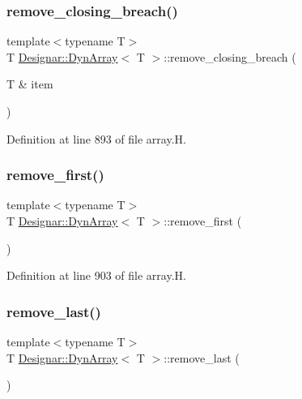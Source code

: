 \subsubsection{\texorpdfstring{remove\+\_\+closing\+\_\+breach()}{remove\_closing\_breach()}}
{\footnotesize\ttfamily template$<$typename T$>$ \\
T \hyperlink{class_designar_1_1_dyn_array}{Designar\+::\+Dyn\+Array}$<$ T $>$\+::remove\+\_\+closing\+\_\+breach (\begin{DoxyParamCaption}\item[{T \&}]{item }\end{DoxyParamCaption})\hspace{0.3cm}{\ttfamily [inline]}}



Definition at line 893 of file array.\+H.

\mbox{\label{class_designar_1_1_dyn_array_a4dc47bbb1961b4b3d8c8938e76bb77bd}} 
\subsubsection{\texorpdfstring{remove\+\_\+first()}{remove\_first()}}
{\footnotesize\ttfamily template$<$typename T$>$ \\
T \hyperlink{class_designar_1_1_dyn_array}{Designar\+::\+Dyn\+Array}$<$ T $>$\+::remove\+\_\+first (\begin{DoxyParamCaption}{ }\end{DoxyParamCaption})\hspace{0.3cm}{\ttfamily [inline]}}



Definition at line 903 of file array.\+H.

\mbox{\label{class_designar_1_1_dyn_array_a3e96bcac8a97cb56544d6466e834f8ac}} 
\subsubsection{\texorpdfstring{remove\+\_\+last()}{remove\_last()}}
{\footnotesize\ttfamily template$<$typename T$>$ \\
T \hyperlink{class_designar_1_1_dyn_array}{Designar\+::\+Dyn\+Array}$<$ T $>$\+::remove\+\_\+last (\begin{DoxyParamCaption}{ }\end{DoxyParamCaption})\hspace{0.3cm}{\ttfamily [inline]}}



